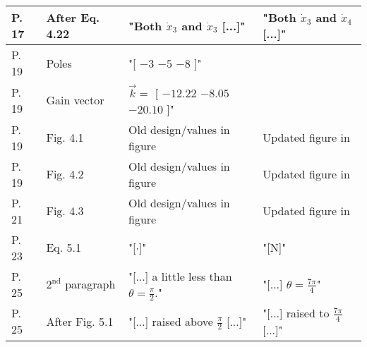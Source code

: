\begin{table}[H]
\begin{tabular}{|lp{4cm}|p{10cm}|p{10cm}|}
    P. 17 & After Eq. 4.22      & "Both $\dot{x}_3$ and $\dot{x}_3$ [...]" & "Both $\dot{x}_3$ and $\dot{x}_4$ [...]" \\
    \hline %
    P. 19 & Poles               & "[ $-3$ $-5$ $-8$ ]"  &                                \\
    \hline %
    P. 19 & Gain vector         & \text{"}$\vec{k} =$ [ $-12.22$ $-8.05$ $-20.10$ ]" &      \\
    \hline %
    P. 19 & Fig. 4.1            & Old design/values in figure  & Updated figure in       \\
    \hline %
    P. 19 & Fig. 4.2            & Old design/values in figure  & Updated figure in       \\
    \hline %
    P. 21 & Fig. 4.3            & Old design/values in figure  & Updated figure in       \\
    \hline %
    P. 23 & Eq. 5.1             & "[$\cdot$]"      &  "[\si{N}]"                         \\
    \hline %
    P. 25 & $2^\mathrm{nd}$ paragraph & "[...] a little less than $\theta = \frac{\pi}{2}$." & "[...] $\theta = \frac{7\pi}{4}$" \\
    \hline %
    P. 25 & After Fig. 5.1      & "[...] raised above $\frac{\pi}{2}$ [...]" & "[...] raised to $\frac{7\pi}{4}$ [...]" \\
    \hline %
  \end{tabular}
\end{table}